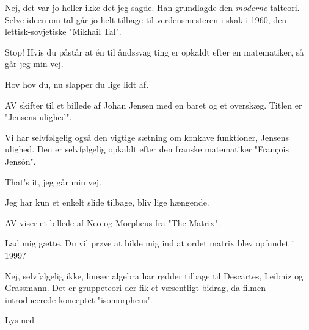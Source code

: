\documentclass[a4paper, 11pt]{article}
\begin{document}
\begin{sketch}
 Nej, det var jo heller ikke det jeg sagde. Han grundlagde den \textit{moderne} talteori. Selve ideen om tal går jo helt tilbage til verdensmesteren i skak i 1960, den lettisk-sovjetiske "Mikhail Tal".

 Stop! Hvis du påstår at én til åndssvag ting er opkaldt efter en matematiker, så går jeg min vej. 

 Hov hov du, nu slapper du lige lidt af. 

\scene AV skifter til et billede af Johan Jensen med en baret og et overskæg. Titlen er "Jensens ulighed".

 Vi har selvfølgelig også den vigtige sætning om konkave funktioner, Jensens ulighed. Den er selvfølgelig opkaldt efter den franske matematiker "François Jensôn". 

 That's it, jeg går min vej.

 Jeg har kun et enkelt slide tilbage, bliv lige hængende.

\scene AV viser et billede af Neo og Morpheus fra "The Matrix".

 Lad mig gætte. Du vil prøve at bilde mig ind at ordet matrix blev opfundet i 1999? 

 Nej, selvfølgelig ikke, lineær algebra har rødder tilbage til Descartes, Leibniz og Grassmann. Det er gruppeteori der fik et væsentligt bidrag, da filmen introducerede konceptet "isomorpheus".  

\scene Lys ned
\end{sketch}
\end{document}
